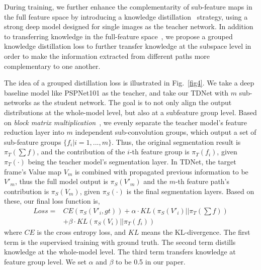 \documentclass[10pt,twocolumn,letterpaper]{article}
\begin{document}
During training, we further enhance the complementarity of sub-feature maps in the full feature space by introducing a knowledge distillation~\cite{hinton2015distilling} strategy, using a strong deep model designed for single images as the teacher network. 
In addition to transferring knowledge in the full-feature space~\cite{hinton2015distilling,Liu_2019_CVPR,He_2019_CVPR}, we propose a grouped knowledge distillation loss to further transfer knowledge at the subspace level in order to make the information extracted from different paths more complementary to one another.

The idea of a grouped distillation loss is illustrated in Fig.~\ref{fig4}. 
We take a deep baseline model like PSPNet101 as the teacher, and take our TDNet with $m$ sub-networks as the student network. 
The goal is to not only align the output distributions at the whole-model level, but also at a subfeature group level. 
Based on \textit{block matrix multiplication}~\cite{eves1980elementary}, we evenly separate the teacher model's feature reduction layer into $m$ independent sub-convolution groups, which output a set of sub-feature groups $\{f_i|i=1,...,m\}$. 
Thus, the original segmentation result is $\pi_T(\sum f)$, and the contribution of the $i$-th feature group is $\pi_T(f_i)$, given  $\pi_T(\cdot)$ being the teacher model's segmentation layer. 
In TDNet, the target frame's Value map $V_m$ is combined with propagated previous information to be $V'_m$, thus the full model output is $\pi_S(V'_m)$ and the $m$-th feature path's contribution is $\pi_S(V_m)$, given $\pi_S(\cdot)$ is the final segmentation layers. Based on these, our final loss function is,
\begin{align}
Loss= &CE(\pi_S(V'_i, gt)) + \alpha\cdot KL(\pi_S(V'_i)||\pi_T(\sum f))\nonumber\\
      &+\beta\cdot KL(\pi_S(V_i)||\pi_T(f_i))
\label{eq7}
\end{align}
\noindent where $CE$ is the cross entropy loss, and $KL$ means the KL-divergence. The first term is the supervised training with ground truth. The second term distills knowledge at the whole-model level. The third term transfers knowledge at feature group level. We set $\alpha$ and $\beta$ to be 0.5 in our paper.
\end{document}
